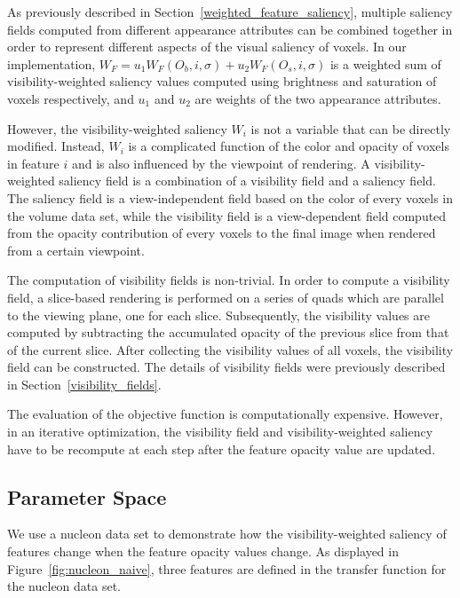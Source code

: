 As previously described in Section~\ref{weighted_feature_saliency}, multiple saliency fields computed from different appearance attributes can be combined together in order to represent different aspects of the visual saliency of voxels.
In our implementation, $ W_{F}=u_{1}W_{F}(O_{b},i,\sigma)+u_{2}W_{F}(O_{s},i,\sigma) $ is a weighted sum of visibility-weighted saliency values computed using brightness and saturation of voxels respectively, and $ u_{1} $ and $ u_{2} $ are weights of the two appearance attributes.

However, the visibility-weighted saliency $ W_{i} $ is not a variable that can be directly modified. Instead, $ W_{i} $ is a complicated function of the color and opacity of voxels in feature $ i $ and is also influenced by the viewpoint of rendering. A visibility-weighted saliency field is a combination of a visibility field and a saliency field. The saliency field is a view-independent field based on the color of every voxels in the volume data set, while the visibility field is a view-dependent field computed from the opacity contribution of every voxels to the final image when rendered from a certain viewpoint.

The computation of visibility fields is non-trivial. In order to compute a visibility field, a slice-based rendering is performed on a series of quads which are parallel to the viewing plane, one for each slice.
Subsequently, the visibility values are computed by subtracting the accumulated opacity of the previous slice from that of the current slice. After collecting the visibility values of all voxels, the visibility field can be constructed. The details of visibility fields were previously described in Section~\ref{visibility_fields}.

The evaluation of the objective function is computationally expensive. However, in an iterative optimization, the visibility field and visibility-weighted saliency have to be recompute at each step after the feature opacity value are updated.

\subsection{Parameter Space}
We use a nucleon data set \cite{website:Voreen_datasets_2013} to demonstrate how the visibility-weighted saliency of features change when the feature opacity values change. As displayed in Figure~\ref{fig:nucleon_naive}, three features are defined in the transfer function for the nucleon data set.

